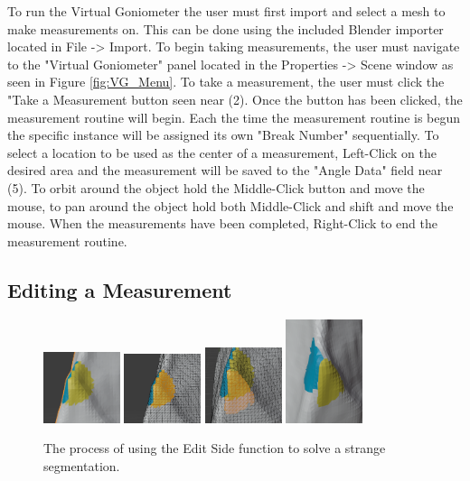 \documentclass[11pt,leqno]{article}
\theoremstyle{definition}
\begin{document}
To run the Virtual Goniometer the user must first import and select a mesh to make measurements on. This can be done using the included Blender importer located in File -> Import. To begin taking measurements, the user must navigate to the "Virtual Goniometer" panel located in the Properties -> Scene window as seen in Figure \ref{fig:VG_Menu}. To take a measurement, the user must click the "Take a Measurement button seen near (2). Once the button has been clicked, the measurement routine will begin. Each the time the measurement routine is begun the specific instance will be assigned its own "Break Number" sequentially. To select a location to be used as the center of a measurement, Left-Click on the desired area and the measurement will be saved to the "Angle Data" field near (5). To orbit around the object hold the Middle-Click button and move the mouse, to pan around the object hold both Middle-Click and shift and move the mouse. When the measurements have been completed, Right-Click to end the measurement routine.


\subsection{Editing a Measurement}
\begin{figure}
\centering
\includegraphics[width=0.2\textwidth]{Edit 1.PNG}
\includegraphics[width=0.2\textwidth]{Edit 2.PNG}
\includegraphics[width=0.2\textwidth]{Edit 3.PNG}
\includegraphics[width=0.2\textwidth]{Edit 4.PNG}
\caption{The process of using the Edit Side function to solve a strange segmentation.}
\label{fig:VG_EditExample}
\end{figure}
\end{document}
